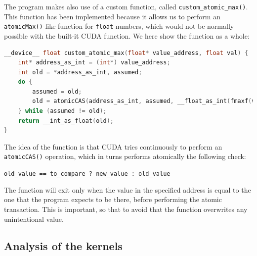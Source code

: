 \documentclass[11pt, journal]{IEEEtran}
\newcommand{\nwl}{

\vspace{11pt}

}
\begin{document}
The program makes also use of a custom function, called \verb|custom_atomic_max()|. This function has been implemented because it allows us to perform an \verb|atomicMax()|-like function for \verb|float| numbers, which would not be normally possible with the built-it CUDA function. We here show the function as a whole:
\nwl
\begin{lstlisting}[language = C]
__device__ float custom_atomic_max(float* value_address, float val) {
    int* address_as_int = (int*) value_address;
    int old = *address_as_int, assumed;
    do {
        assumed = old;
        old = atomicCAS(address_as_int, assumed, __float_as_int(fmaxf(val, __int_as_float(assumed))));
    } while (assumed != old);
    return __int_as_float(old);
}\end{lstlisting}
\nwl
The idea of the function is that CUDA tries continuously to perform an \verb|atomicCAS()| operation, which in turns performs atomically the following check:
\begin{center}
    \scriptsize
    \verb|old_value == to_compare ? new_value : old_value|
\end{center}

The function will exit only when the value in the specified address is equal to the one that the program expects to be there, before performing the atomic transaction. This is important, so that to avoid that the function overwrites any unintentional value.

\subsection{Analysis of the kernels}
\end{document}
